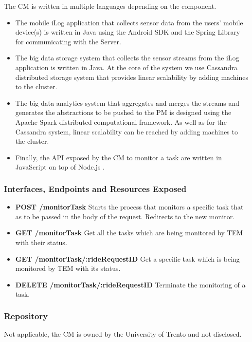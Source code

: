 The CM is written in multiple languages depending on the component. 
\begin{itemize}
\item{The mobile iLog application that collects sensor data from the users' mobile device(s) is written in Java using the Android SDK and the Spring Library for communicating with the Server.}
\item{The big data storage system that collects the sensor streams from the iLog application is written in Java. At the core of the system we use Cassandra distributed storage system that provides linear scalability by adding machines to the cluster.}
\item{The big data analytics system that aggregates and merges the streams and generates the abstractions to be pushed to the PM is designed using the Apache Spark distributed computational framework. As well as for the Cassandra system, linear scalability can be reached by adding machines to the cluster.}
\item{Finally, the API exposed by the CM to monitor a task are written in JavaScript on top of Node.js .}
\end{itemize}

\subsubsection{Interfaces, Endpoints and Resources Exposed}

\begin{itemize}
\item {\bf POST /monitorTask} Starts the process that monitors a specific task that as to be passed in the body of the request. Redirects to the new monitor. 
\item {\bf GET /monitorTask} Get all the tasks which are being monitored by TEM with their status.
\item {\bf GET /monitorTask/:rideRequestID} Get a specific task which is being monitored by TEM with its status.
\item {\bf DELETE /monitorTask/:rideRequestID} Terminate the monitoring of a task.
\end{itemize}

\subsubsection{Repository}
Not applicable, the CM is owned by the University of Trento and not disclosed. 
